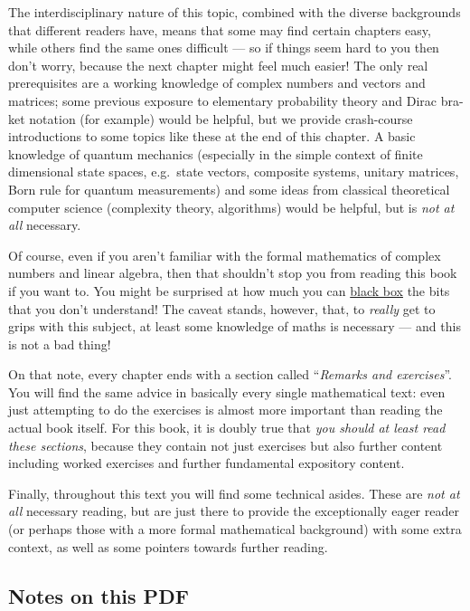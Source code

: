\documentclass[fleqn,a4paper]{article}
\theoremstyle{definition}
\theoremstyle{definition}
\theoremstyle{definition}
\theoremstyle{definition}
\theoremstyle{remark}
\begin{document}
The interdisciplinary nature of this topic, combined with the diverse backgrounds that different readers have, means that some may find certain chapters easy, while others find the same ones difficult --- so if things seem hard to you then don't worry, because the next chapter might feel much easier!
The only real prerequisites are a working knowledge of complex numbers and vectors and matrices; some previous exposure to elementary probability theory and Dirac bra-ket notation (for example) would be helpful, but we provide crash-course introductions to some topics like these at the end of this chapter.
A basic knowledge of quantum mechanics (especially in the simple context of finite dimensional state spaces, e.g.~state vectors, composite systems, unitary matrices, Born rule for quantum measurements) and some ideas from classical theoretical computer science (complexity theory, algorithms) would be helpful, but is \emph{not at all} necessary.

Of course, even if you aren't familiar with the formal mathematics of complex numbers and linear algebra, then that shouldn't stop you from reading this book if you want to.
You might be surprised at how much you can \href{https://en.wikipedia.org/wiki/Black_box}{black box} the bits that you don't understand!
The caveat stands, however, that, to \emph{really} get to grips with this subject, at least some knowledge of maths is necessary --- and this is not a bad thing!

On that note, every chapter ends with a section called ``\emph{Remarks and exercises}''.
You will find the same advice in basically every single mathematical text: even just attempting to do the exercises is almost more important than reading the actual book itself.
For this book, it is doubly true that \emph{you should at least read these sections}, because they contain not just exercises but also further content including worked exercises and further fundamental expository content.

Finally, throughout this text you will find some technical asides.
These are \emph{not at all} necessary reading, but are just there to provide the exceptionally eager reader (or perhaps those with a more formal mathematical background) with some extra context, as well as some pointers towards further reading.

\hypertarget{notes-on-this-pdf}{%
\subsection*{Notes on this PDF}\label{notes-on-this-pdf}}
\end{document}

